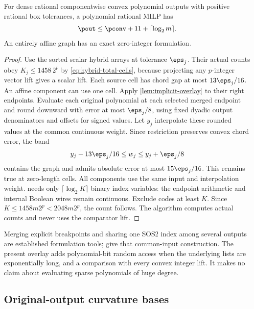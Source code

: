 \begin{theorem}\label{thm:convex-vector-overlay}
For dense rational componentwise convex polynomial outputs with positive
rational box tolerances, a polynomial rational MILP has
\[
 \pout\le\pconv+11+\lceil\log_2m\rceil.
\]
An entirely affine graph has an exact zero-integer formulation.
\end{theorem}
\begin{proof}
Use the sorted scalar hybrid arrays at tolerance $\eps_j$. Their actual
counts obey $K_j\le1458\,2^p$ by \eqref{eq:hybrid-total-cells}, because
projecting any $p$-integer vector lift gives a scalar lift. Each source
cell has chord gap at most $13\eps_j/16$. An affine component can use
one cell. Apply \cref{lem:implicit-overlay} to their right endpoints.
Evaluate each original polynomial at each selected merged endpoint
and round downward with error at most $\eps_j/8$, using fixed dyadic
output denominators and offsets for signed values. Let $y_j$ interpolate
these rounded values at the common continuous weight. Since restriction
preserves convex chord error, the band
\begin{equation}\label{eq:vector-directed-band}
 y_j-13\eps_j/16\le w_j\le y_j+\eps_j/8
\end{equation}
contains the graph and admits absolute error at most $15\eps_j/16$.
This remains true at zero-length cells. All components use the same
input and interpolation weight.  needs
only $\lceil\log_2K\rceil$ binary index variables: the endpoint
arithmetic and internal Boolean wires remain continuous. Exclude codes
at least $K$. Since $K\le1458m2^p<2048m2^p$, the count follows.
The algorithm computes actual counts and never uses the comparator lift.
\end{proof}

Merging explicit breakpoints and sharing one SOS2 index among several
outputs are established formulation tools; \citet[Section 3,
Proposition 1]{lyu2026} give that common-input construction. The present
overlay adds polynomial-bit random access when the underlying lists are
exponentially long, and a comparison with every convex integer lift.
It makes no claim about evaluating sparse polynomials of huge degree.

\subsection{Original-output curvature bases}

